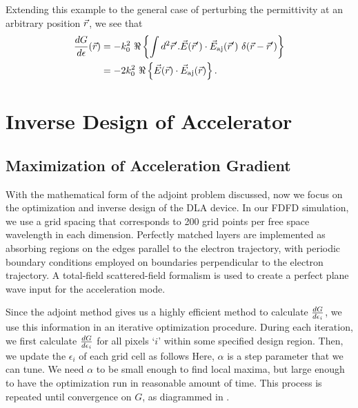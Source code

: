 Extending this example to the general case of perturbing the permittivity at an arbitrary position $\vec{r}$, we see that
%
\begin{align}
    \frac{d G}{d \epsilon}(\vec{r}) &= -k_0^2 \  \Re \left\{  \int{d^2\vec{r}'}.
    \vec{E}(\vec{r}') \cdot \vec{E}_{\textrm{aj}}(\vec{r}')~
    \delta(\vec{r}-\vec{r}')  \right\}  \\
    &= -2k_0^2 \  \Re \left\{  \vec{E}(\vec{r}) \cdot \vec{E}_{\textrm{aj}}(\vec{r})  \right\} .
\end{align}
%
\section{Inverse Design of Accelerator}

\subsection{Maximization of Acceleration Gradient}

With the mathematical form of the adjoint problem discussed, now we focus on the optimization and inverse design of the DLA device.
In our FDFD simulation, we use a grid spacing that corresponds to 200 grid points per free space wavelength in each dimension.
Perfectly matched layers are implemented as absorbing regions on the edges parallel to the electron trajectory, with periodic boundary conditions employed on boundaries perpendicular to the electron trajectory.
A total-field scattered-field \cite{taflove2000computational} formalism is used to create a perfect plane wave input for the acceleration mode.

Since the adjoint method gives us a highly efficient method to calculate $\frac{d G}{d \epsilon_{i}}$, we use this information in an iterative optimization procedure.
During each iteration, we first calculate $\frac{d G}{d \epsilon_{i}}$ for all pixels `$i$' within some specified design region.
Then, we update the $\epsilon_i$ of each grid cell as follows
%
%
Here, $\alpha$ is a step parameter that we can tune.
We need $\alpha$ to be small enough to find local maxima, but large enough to have the optimization run in reasonable amount of time.
This process is repeated until convergence on $G$, as diagrammed in .


